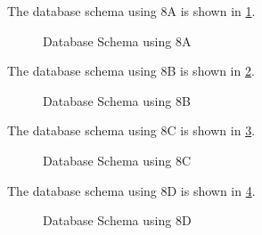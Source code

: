 \documentclass[12pt,letterpaper,titlepage,en-US]{article}
\begin{document}
\pagebreak

\begin{homeworkProblem}
\begin{homeworkSubProblem}[Use 8A]
The database schema using 8A is shown in \cref{sales_schema_a}.

\begin{figure}[!htb]
\centering
  \caption{Database Schema using 8A}
  \label{sales_schema_a}
\end{figure}
\end{homeworkSubProblem}

\pagebreak

\begin{homeworkSubProblem}[Use 8B]
The database schema using 8B is shown in \cref{sales_schema_b}.

\begin{figure}[!htb]
\centering
  \caption{Database Schema using 8B}
  \label{sales_schema_b}
\end{figure}
\end{homeworkSubProblem}

\pagebreak

\begin{homeworkSubProblem}[Use 8C]
The database schema using 8C is shown in \cref{sales_schema_c}.

\begin{figure}[!htb]
\centering
  \caption{Database Schema using 8C}
  \label{sales_schema_c}
\end{figure}
\end{homeworkSubProblem}

\pagebreak

\begin{homeworkSubProblem}[Use 8D]
The database schema using 8D is shown in \cref{sales_schema_d}.

\begin{figure}[!htb]
\centering
  \caption{Database Schema using 8D}
  \label{sales_schema_d}
\end{figure}
\end{homeworkSubProblem}

\end{homeworkProblem}
\end{document}
